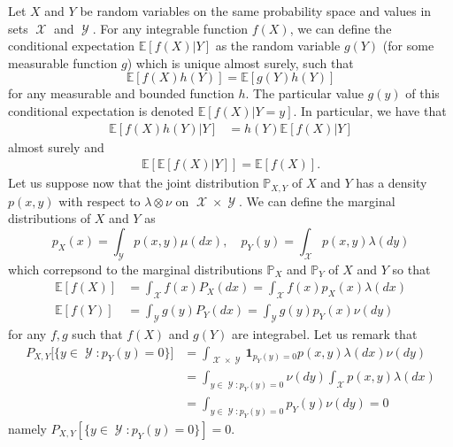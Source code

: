 \documentclass[
	fontsize=11pt, %
	twoside=false, %
	numbers=noenddot, %
]{kaobook}
\DeclareMathOperator{\cX}{\mathcal X}
\DeclareMathOperator{\cY}{\mathcal Y}
\renewcommand{\P}{\mathbb P}
\newcommand{\E}{\mathbb E}
\newcommand{\ind}[1]{\mathbf 1_{#1}}
\begin{document}
Let $X$ and $Y$ be random variables on the same probability space and values in sets $\cX$ and $\cY$.
For any integrable function $f(X)$, we can define the conditional expectation $\E [f(X) | Y]$ as the random variable $g(Y)$ (for some measurable function $g$) which is unique almost surely, such that
\begin{equation}
	\E[f(X) h(Y)] = \E[ g(Y) h(Y)]
\end{equation}
for any measurable and bounded function $h$.
The particular value $g(y)$ of this conditional expectation is denoted $\E[f(X) | Y = y]$. 
In particular, we have that
\begin{align*}
	\E[f(X) h(Y) | Y] &= h(Y) \E[ f(X) | Y]
\end{align*}
almost surely and
\begin{align}
	\E [\E[ f(X) | Y]] = \E[f(X)].
\end{align}
Let us suppose now that the joint distribution $\P_{X, Y}$ of $X$ and $Y$ has a density $p(x, y)$ with respect to $\lambda \otimes \nu$ on $\cX \times \cY$.
We can define the marginal distributions of $X$ and $Y$ as
\begin{equation*}
	p_X(x) = \int_{\cY} p(x, y) \mu(dx), \quad
	p_Y(y) = \int_{\cX} p(x, y) \lambda(dy)
\end{equation*}
which correpsond to the marginal distributions $\P_X$ and $\P_Y$ of $X$ and $Y$ so that
\begin{align*}
	\E[f(X)] &= \int_{\cX} f(x) P_X(dx) = \int_{\cX} f(x) p_X(x) \lambda(dx) \\ 
	\E[f(Y)] &= \int_{\cY} g(y) P_Y(dx) = \int_{\cY} g(y) p_Y(x) \nu(dy)
\end{align*}
for any $f, g$ such that $f(X)$ and $g(Y)$ are integrabel. 
Let us remark that
\begin{align*}
	P_{X, Y} \big[ \{ y \in \cY : p_Y(y) = 0 \} \big] &= \int_{\cX \times \cY} \ind{p_Y(y) = 0} p(x, y) \lambda(dx) \nu(dy) \\
	&= \int_{y \in \cY : p_Y(y) = 0} \nu(dy) \int_{\cX} p(x, y) \lambda (dx) \\
	&= \int_{y \in \cY : p_Y(y) = 0} p_Y(y) \nu(dy) = 0
\end{align*}
namely $P_{X, Y}[ \{ y \in \cY : p_Y(y) = 0 \}] = 0$.


\end{document}
